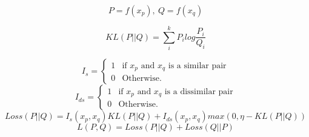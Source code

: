 \begin{equation}
  P = f(x_p), ~ Q = f(x_q)
\end{equation}

\begin{equation}
  KL(P||Q) = \sum_i^k P_ilog\frac{P_i}{Q_i}
\end{equation}

\begin{equation}
  I_s = \left\{
\begin{array}{ll}
  1 & \mbox{if $x_p$ and $x_q$ is a similar pair}\\
  0 & \mbox{Otherwise.}
\end{array}
\right.
\end{equation}
%
\begin{equation}
  I_{ds} = \left\{
\begin{array}{ll}
  1 & \mbox{if $x_p$ and $x_q$ is a dissimilar pair}\\
  0 & \mbox{Otherwise.}
\end{array}
\right.
\end{equation}
\begin{equation}
  Loss(P || Q) = I_s(x_p, x_q)KL(P || Q) + I_{ds}(x_p, x_q)max(0,
  \eta-KL(P||Q))
\end{equation}
\begin{equation}
  L(P,Q) = Loss(P || Q) + Loss(Q || P)
\end{equation}
